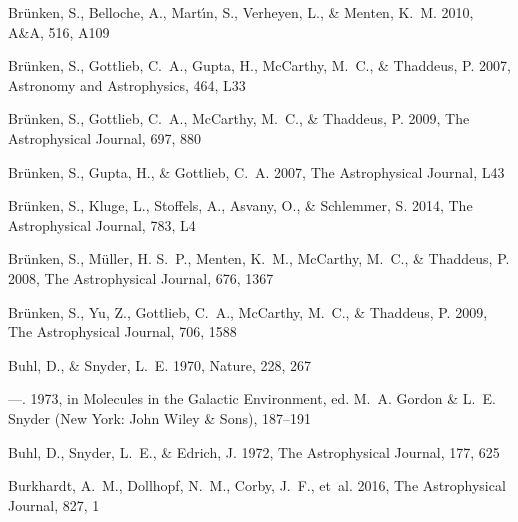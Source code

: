 \documentclass[twocolumn]{aastex631}
\begin{document}
\begin{thebibliography}{}
Br{\"u}nken, S., Belloche, A., Mart{\'\i}n, S., Verheyen, L., \& Menten, K.~M.
  2010, A{\&}A, 516, A109

Br{\"u}nken, S., Gottlieb, C.~A., Gupta, H., McCarthy, M.~C., \& Thaddeus, P.
  2007{}, Astronomy and Astrophysics, 464, L33

Br{\"u}nken, S., Gottlieb, C.~A., McCarthy, M.~C., \& Thaddeus, P.
  2009{}, The Astrophysical Journal, 697, 880

Br{\"u}nken, S., Gupta, H., \& Gottlieb, C.~A. 2007{}, The
  Astrophysical Journal, L43

Br{\"u}nken, S., Kluge, L., Stoffels, A., Asvany, O., \& Schlemmer, S. 2014,
  The Astrophysical Journal, 783, L4

Br{\"u}nken, S., M{\"u}ller, H. S.~P., Menten, K.~M., McCarthy, M.~C., \&
  Thaddeus, P. 2008, The Astrophysical Journal, 676, 1367

Br{\"u}nken, S., Yu, Z., Gottlieb, C.~A., McCarthy, M.~C., \& Thaddeus, P.
  2009{}, The Astrophysical Journal, 706, 1588

Buhl, D., \& Snyder, L.~E. 1970, Nature, 228, 267

---. 1973, in Molecules in the Galactic Environment, ed. M.~A. Gordon \& L.~E.
  Snyder (New York: John Wiley {\&} Sons), 187--191

Buhl, D., Snyder, L.~E., \& Edrich, J. 1972, The Astrophysical Journal, 177,
  625

Burkhardt, A.~M., Dollhopf, N.~M., Corby, J.~F., {et~al.} 2016, The
  Astrophysical Journal, 827, 1


\end{thebibliography}
\end{document}
